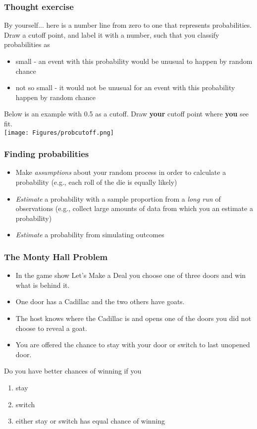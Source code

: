 \begin{frame}
\frametitle{Thought exercise}
By yourself...  here is a number line from zero to one that represents probabilities.  Draw a cutoff point, and label it with a number, such that you classify probabilities as
\begin{itemize}
\item small - an event with this probability would be unusual to happen by random chance
\item not so small - it would not be unusual for an event with this probability happen by random chance
\end{itemize}
\vskip10pt
Below is an example with 0.5 as a cutoff.  Draw \textbf{your} cutoff point where \textbf{you} see fit.\\
\vskip10pt
\texttt{[image: Figures/probcutoff.png]}
\end{frame}

\begin{frame}
\frametitle{Finding probabilities}
\begin{itemize}
    \item
    Make \emph{assumptions} about your random process in order to calculate a probability (e.g., each roll of the die is equally likely)
    \item
    \emph{Estimate} a probability with a sample proportion from a \emph{long run} of observations (e.g., collect large amounts of data from which you an estimate a probability)
    \item
    \emph{Estimate} a probability from simulating outcomes
\end{itemize}
\end{frame}




\begin{frame}
\frametitle{The Monty Hall Problem}
\begin{itemize}
    \item
    In the game show Let's Make a Deal you choose one of three doors and win what is behind it.
    \item
    One door has a Cadillac and the two others have goats.
    \item
    The host knows where the Cadillac is and opens one of the doors you did not choose to reveal a goat.
    \item
    You are offered the chance to stay with your door or switch to last unopened door.
\end{itemize}
\begin{clicker}{Do you have better chances of winning if you}
\begin{enumerate}
    \item
    stay
    \item
    switch
    \item
    either stay or switch has equal chance of winning
\end{enumerate}
\end{clicker}
\end{frame}

